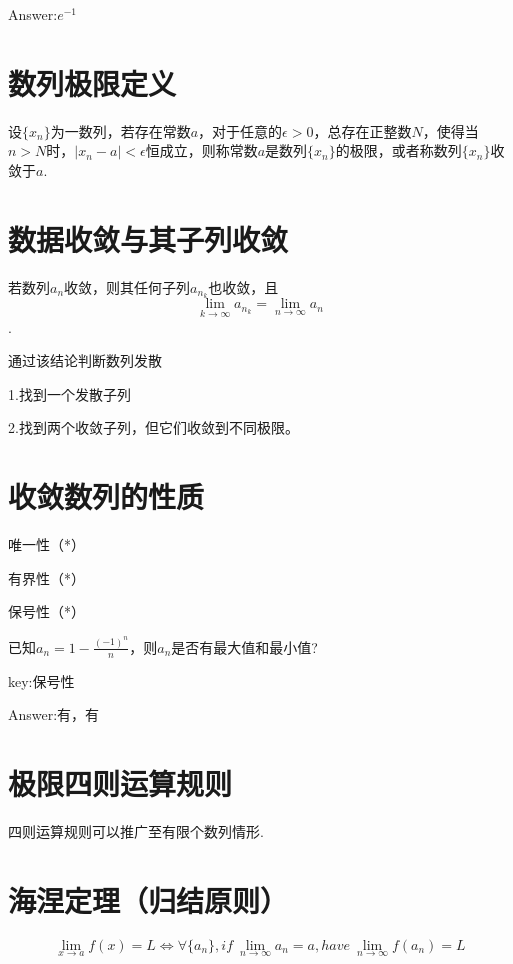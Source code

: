 \documentclass[12pt, a4paper, oneside]{ctexbook}
\begin{document}
Answer:$e^{-1}$

\section{数列极限定义}

设$\{x_n\}$为一数列，若存在常数$a$，对于任意的$\epsilon >0$，总存在正整数$N$，使得当$n>N$时，$|x_n-a|<\epsilon$恒成立，则称常数$a$是数列$\{x_n\}$的极限，或者称数列$\{x_n\}$收敛于$a$.

\section{数据收敛与其子列收敛}

若数列{$a_n$}收敛，则其任何子列{$a_{n_k}$}也收敛，且\[\lim\limits_{k \to \infty}a_{n_k}=\lim\limits_{n \to \infty}a_n\].

通过该结论判断数列发散

1.找到一个发散子列

2.找到两个收敛子列，但它们收敛到不同极限。

\hspace*{\fill}

\section{收敛数列的性质}

唯一性（*）

有界性（*）

保号性（*）

\hspace*{\fill}

已知$a_n=1-\frac{(-1)^n}{n}$，则{$a_n$}是否有最大值和最小值?

key:保号性

Answer:有，有


\section{极限四则运算规则}

四则运算规则可以推广至有限个数列情形.

\hspace*{\fill}


\section{海涅定理（归结原则）}

\[\lim\limits_{x \to a}f(x)=L \iff \forall\{a_n\},if\ \lim\limits_{n \to \infty}a_n=a,have\ \lim\limits_{n \to \infty}f(a_n)=L\]
\end{document}
